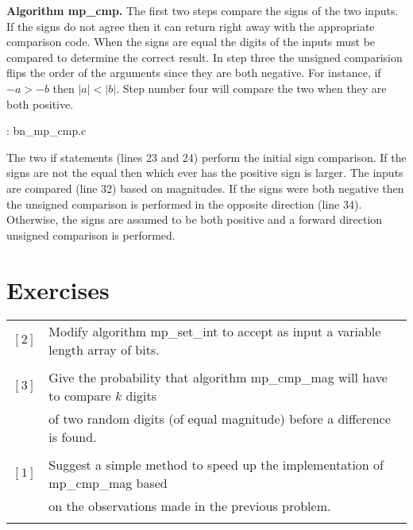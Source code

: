 \documentclass[b5paper]{book}
\begin{document}
\textbf{Algorithm mp\_cmp.}
The first two steps compare the signs of the two inputs.  If the signs do not agree then it can return right away with the appropriate 
comparison code.  When the signs are equal the digits of the inputs must be compared to determine the correct result.  In step 
three the unsigned comparision flips the order of the arguments since they are both negative.  For instance, if $-a > -b$ then 
$\vert a \vert < \vert b \vert$.  Step number four will compare the two when they are both positive.

\vspace{+3mm}\begin{small}
\hspace{-5.1mm}{\bf File}: bn\_mp\_cmp.c
\vspace{-3mm}
\begin{alltt}
\end{alltt}
\end{small}

The two if statements (lines 23 and 24) perform the initial sign comparison.  If the signs are not the equal then which ever
has the positive sign is larger.   The inputs are compared (line 32) based on magnitudes.  If the signs were both 
negative then the unsigned comparison is performed in the opposite direction (line 34).  Otherwise, the signs are assumed to 
be both positive and a forward direction unsigned comparison is performed.

\section*{Exercises}
\begin{tabular}{cl}
$\left [ 2 \right ]$ & Modify algorithm mp\_set\_int to accept as input a variable length array of bits. \\
                     & \\
$\left [ 3 \right ]$ & Give the probability that algorithm mp\_cmp\_mag will have to compare $k$ digits  \\
                     & of two random digits (of equal magnitude) before a difference is found. \\
                     & \\
$\left [ 1 \right ]$ & Suggest a simple method to speed up the implementation of mp\_cmp\_mag based  \\
                     & on the observations made in the previous problem. \\
                     &
\end{tabular}
\end{document}
